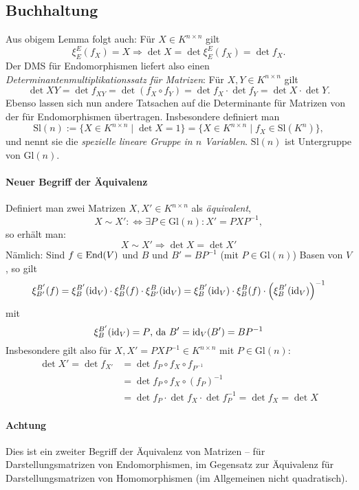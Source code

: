 \subsection{Buchhaltung}
 	Aus obigem Lemma folgt auch:
 	Für $ X\in K^{n\times n} $ gilt
 	\[
 		\xi_E^E(f_X) = X \Rightarrow \det X = \det \xi_E^E(f_X) = \det f_X.
 	\]
 	Der DMS für Endomorphismen liefert also einen \emph{Determinantenmultiplikationssatz für Matrizen}: Für $ X,Y\in K^{n\times n} $ gilt
 	\[
 		\det XY = \det f_{XY} = \det(f_X\circ f_Y) = \det f_X\cdot \det f_Y = \det X\cdot \det Y.
 	\]
 	Ebenso lassen sich nun andere Tatsachen auf die Determinante für Matrizen von der für Endomorphismen übertragen. Insbesondere definiert man
 	\[
 		\mathrm{Sl}(n) := \{X\in K^{n\times n}\mid \det X=1 \} = \{X\in K^{n\times n}\mid f_X\in \mathrm{Sl}(K^n)\},
 	\]
 	und nennt sie die \emph{spezielle lineare Gruppe in $n$ Variablen}. $ \mathrm{Sl}(n) $ ist Untergruppe von $ \mathrm{Gl}(n) $.
 	\paragraph{Neuer Begriff der Äquivalenz}
 		Definiert man zwei Matrizen $ X,X' \in K^{n\times n}$ als \emph{äquivalent},
 		\[
 			X\sim X' :\Leftrightarrow \exists P\in \mathrm{Gl}(n): X' =PXP^{-1},
 		\]
 		so erhält man:
 		\[
 			X\sim X' \Rightarrow \det X = \det X'
 		\]
 		Nämlich: Sind $ f\in \operatorname{End}(V) $ und $ B $ und $ B'=BP^{-1} $ (mit $ P\in \mathrm{Gl}(n) $) Basen von $ V $, so gilt
 		\[
 			\xi_{B'}^{B'}(f) = \xi_{B}^{B'}(\operatorname{id}_V)\cdot \xi_B^B(f)\cdot \xi_{B'}^{B}(\operatorname{id}_V) =
 			\xi_{B}^{B'}(\operatorname{id}_V)\cdot \xi_B^B(f)\cdot \left(\xi^{B'}_{B}(\operatorname{id}_V)\right)^{-1}
 		\]
 		mit
 		\[
 			\xi_B^{B'}(\operatorname{id}_V) = P \text{, da } B' = \operatorname{id}_V(B') = BP^{-1}
 		\]
 		Insbesondere gilt also für $ X,X' = PXP^{-1}\in K^{n\times n} $ mit $ P\in \mathrm{Gl}(n) $:
 		\begin{align*}
 			\det X' = \det f_{X'} & = \det f_P \circ f_X \circ f_{P^{-1}}                             \\
 			                      & =\det f_P \circ f_X \circ (f_P)^{-1}                              \\
 			                      & = \det f_P \cdot \det f_X \cdot \det f_P^{-1} = \det f_X = \det X
 		\end{align*}
 	\paragraph{Achtung}
 		Dies ist ein zweiter Begriff der Äquivalenz von Matrizen -- für Darstellungsmatrizen von Endomorphismen, im Gegensatz zur Äquivalenz für Darstellungsmatrizen von Homomorphismen (im Allgemeinen nicht quadratisch).